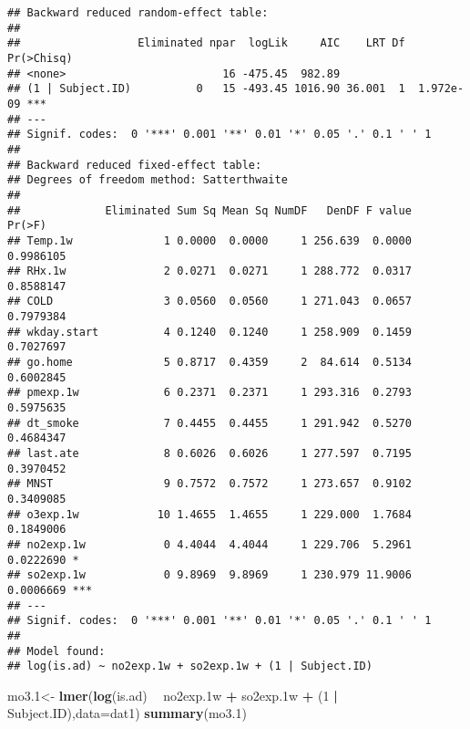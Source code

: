 \documentclass[12pt,]{article}
\newenvironment{Shaded}{\begin{snugshade}}{\end{snugshade}}
\newcommand{\DataTypeTok}[1]{\textcolor[rgb]{0.13,0.29,0.53}{#1}}
\newcommand{\DecValTok}[1]{\textcolor[rgb]{0.00,0.00,0.81}{#1}}
\newcommand{\FloatTok}[1]{\textcolor[rgb]{0.00,0.00,0.81}{#1}}
\newcommand{\KeywordTok}[1]{\textcolor[rgb]{0.13,0.29,0.53}{\textbf{#1}}}
\newcommand{\NormalTok}[1]{#1}
\newcommand{\OperatorTok}[1]{\textcolor[rgb]{0.81,0.36,0.00}{\textbf{#1}}}
\newcommand{\StringTok}[1]{\textcolor[rgb]{0.31,0.60,0.02}{#1}}
\begin{document}
\begin{verbatim}
## Backward reduced random-effect table:
## 
##                  Eliminated npar  logLik     AIC    LRT Df Pr(>Chisq)    
## <none>                        16 -475.45  982.89                         
## (1 | Subject.ID)          0   15 -493.45 1016.90 36.001  1  1.972e-09 ***
## ---
## Signif. codes:  0 '***' 0.001 '**' 0.01 '*' 0.05 '.' 0.1 ' ' 1
## 
## Backward reduced fixed-effect table:
## Degrees of freedom method: Satterthwaite 
## 
##             Eliminated Sum Sq Mean Sq NumDF   DenDF F value    Pr(>F)    
## Temp.1w              1 0.0000  0.0000     1 256.639  0.0000 0.9986105    
## RHx.1w               2 0.0271  0.0271     1 288.772  0.0317 0.8588147    
## COLD                 3 0.0560  0.0560     1 271.043  0.0657 0.7979384    
## wkday.start          4 0.1240  0.1240     1 258.909  0.1459 0.7027697    
## go.home              5 0.8717  0.4359     2  84.614  0.5134 0.6002845    
## pmexp.1w             6 0.2371  0.2371     1 293.316  0.2793 0.5975635    
## dt_smoke             7 0.4455  0.4455     1 291.942  0.5270 0.4684347    
## last.ate             8 0.6026  0.6026     1 277.597  0.7195 0.3970452    
## MNST                 9 0.7572  0.7572     1 273.657  0.9102 0.3409085    
## o3exp.1w            10 1.4655  1.4655     1 229.000  1.7684 0.1849006    
## no2exp.1w            0 4.4044  4.4044     1 229.706  5.2961 0.0222690 *  
## so2exp.1w            0 9.8969  9.8969     1 230.979 11.9006 0.0006669 ***
## ---
## Signif. codes:  0 '***' 0.001 '**' 0.01 '*' 0.05 '.' 0.1 ' ' 1
## 
## Model found:
## log(is.ad) ~ no2exp.1w + so2exp.1w + (1 | Subject.ID)
\end{verbatim}

\begin{Shaded}
\begin{Highlighting}[]
\NormalTok{mo3}\FloatTok{.1}\NormalTok{<-}\StringTok{ }\KeywordTok{lmer}\NormalTok{(}\KeywordTok{log}\NormalTok{(is.ad) }\OperatorTok{~}\StringTok{ }\NormalTok{no2exp}\FloatTok{.1}\NormalTok{w }\OperatorTok{+}\StringTok{ }\NormalTok{so2exp}\FloatTok{.1}\NormalTok{w }\OperatorTok{+}\StringTok{ }\NormalTok{(}\DecValTok{1} \OperatorTok{|}\StringTok{ }\NormalTok{Subject.ID),}\DataTypeTok{data=}\NormalTok{dat1)}
\KeywordTok{summary}\NormalTok{(mo3}\FloatTok{.1}\NormalTok{)}
\end{Highlighting}
\end{Shaded}
\end{document}
